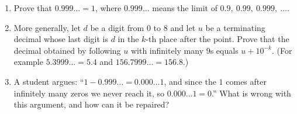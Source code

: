 \begin{enumerate}
\item[(a)] Prove that $0.999\ldots=1$, where $0.999\ldots$ means the limit of $0.9,\ 0.99,\ 0.999,\ \dots$.
\item[(b)] More generally, let $d$ be a digit from $0$ to $8$ and let $u$ be a terminating decimal whose last digit is $d$ in the $k$-th place after the point. Prove that the decimal obtained by following $u$ with infinitely many $9$s equals $u+10^{-k}$. (For example $5.3999\ldots=5.4$ and $156.7999\ldots=156.8$.)
\item[(c)] A student argues: ``$1-0.999\ldots=0.000\ldots1$, and since the $1$ comes after infinitely many zeros we never reach it, so $0.000\ldots1=0$.'' What is wrong with this argument, and how can it be repaired?
\end{enumerate}
